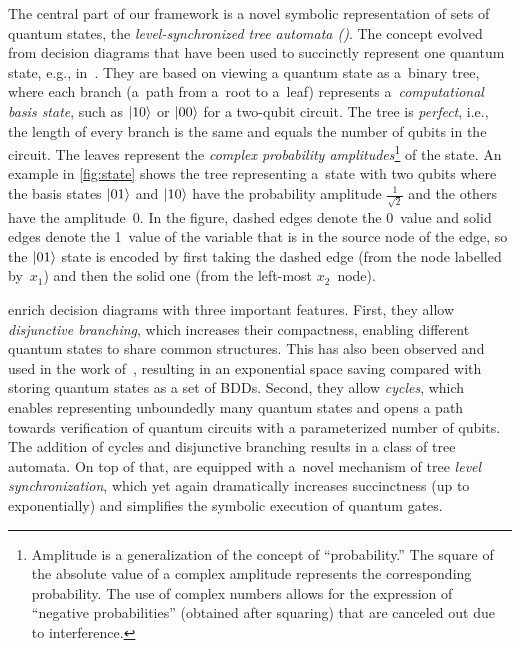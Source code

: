 The central part of our framework is a novel
symbolic representation of sets of quantum states, the \emph{level-synchronized
tree automata (\lstas)}.
The concept evolved from decision diagrams that have been used to succinctly
represent one quantum state, e.g.,
in~\cite{TsaiJJ21,SistlaCR23,VinkhuijzenGHBWL23,MillerT06}.
They are based on viewing a quantum state as a~binary tree,  
where each branch (a~path from a~root to a~leaf) represents a~\emph{computational basis state}, such as $\ket{10}$ or $\ket{00}$ for a two-qubit circuit. 
The tree is \emph{perfect}, i.e., the length of every branch is the same and
equals the number of qubits in the circuit. 
The leaves represent the \emph{complex probability
amplitudes}\footnote{Amplitude is a generalization of the concept of
``probability.'' The square of the absolute value of a complex amplitude
represents the corresponding probability. The use of complex numbers allows for
the expression of ``negative probabilities'' (obtained after squaring) that are canceled out due to interference.} of the state.
An example in \cref{fig:state} shows the tree representing a~state with two qubits 
where the basis states $\ket{01}$ and $\ket{10}$ have the probability amplitude
$\frac{1}{\sqrt{2}}$ and the others have the amplitude~$0$.
In the figure, dashed edges denote the 0~value and solid edges denote the
1~value of the variable that is in the source node of the edge, so the
$\ket{01}$ state is encoded by first taking the dashed edge (from the node
labelled by~$x_1$) and then the solid one (from the left-most $x_2$~node).

\lstas enrich decision diagrams with three important features.
First, they allow \emph{disjunctive branching}, which increases their compactness, enabling different quantum states to share common structures. This has also been observed and used in the work of~\cite{ChenCLLTY23}, resulting in an exponential space saving compared with storing quantum states as a set of BDDs.
Second, they allow \emph{cycles}, which enables representing unboundedly many
quantum states and opens a path towards verification of quantum circuits with a parameterized number of qubits. 
The addition of cycles and disjunctive branching results in a class of tree automata. 
On top of that, \lstas are equipped with a~novel mechanism of tree \emph{level synchronization}, 
which yet again dramatically increases succinctness (up to exponentially) and simplifies the symbolic execution of quantum gates.

